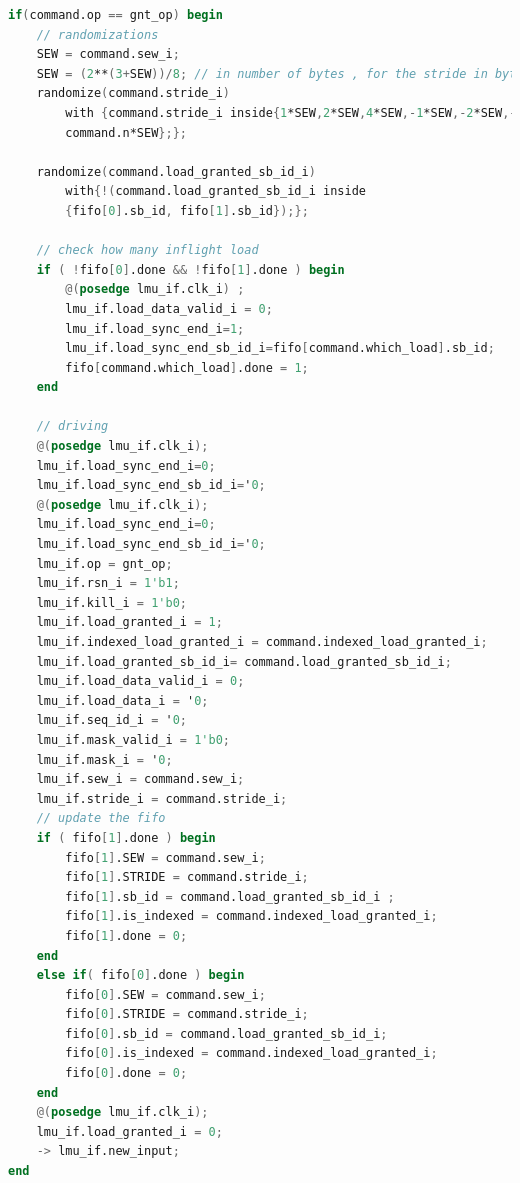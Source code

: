 \begin{lstlisting}[language=Verilog,style=verilog-style, backgroundcolor=\color{lyel_palette}, frame=tlb]
if(command.op == gnt_op) begin
    // randomizations
    SEW = command.sew_i;
    SEW = (2**(3+SEW))/8; // in number of bytes , for the stride in bytes
    randomize(command.stride_i) 
        with {command.stride_i inside{1*SEW,2*SEW,4*SEW,-1*SEW,-2*SEW,-4*SEW,
        command.n*SEW};};

    randomize(command.load_granted_sb_id_i) 
        with{!(command.load_granted_sb_id_i inside
        {fifo[0].sb_id, fifo[1].sb_id});};

    // check how many inflight load
    if ( !fifo[0].done && !fifo[1].done ) begin
	    @(posedge lmu_if.clk_i) ;
	    lmu_if.load_data_valid_i = 0;
	    lmu_if.load_sync_end_i=1;
	    lmu_if.load_sync_end_sb_id_i=fifo[command.which_load].sb_id;	
	    fifo[command.which_load].done = 1;
    end 

    // driving
    @(posedge lmu_if.clk_i);
    lmu_if.load_sync_end_i=0;
    lmu_if.load_sync_end_sb_id_i='0;
    @(posedge lmu_if.clk_i);
    lmu_if.load_sync_end_i=0;
    lmu_if.load_sync_end_sb_id_i='0;
    lmu_if.op = gnt_op;
    lmu_if.rsn_i = 1'b1;
    lmu_if.kill_i = 1'b0;
    lmu_if.load_granted_i = 1;
    lmu_if.indexed_load_granted_i = command.indexed_load_granted_i;
    lmu_if.load_granted_sb_id_i= command.load_granted_sb_id_i;
    lmu_if.load_data_valid_i = 0;
    lmu_if.load_data_i = '0;
    lmu_if.seq_id_i = '0;
    lmu_if.mask_valid_i = 1'b0;
    lmu_if.mask_i = '0;
    lmu_if.sew_i = command.sew_i;     
    lmu_if.stride_i = command.stride_i;
    // update the fifo
    if ( fifo[1].done ) begin
	    fifo[1].SEW = command.sew_i;
	    fifo[1].STRIDE = command.stride_i;
	    fifo[1].sb_id = command.load_granted_sb_id_i ;
	    fifo[1].is_indexed = command.indexed_load_granted_i;
	    fifo[1].done = 0;
    end
    else if( fifo[0].done ) begin
	    fifo[0].SEW = command.sew_i;
	    fifo[0].STRIDE = command.stride_i;
	    fifo[0].sb_id = command.load_granted_sb_id_i;
	    fifo[0].is_indexed = command.indexed_load_granted_i;
	    fifo[0].done = 0;
    end
    @(posedge lmu_if.clk_i);
    lmu_if.load_granted_i = 0;
    -> lmu_if.new_input;
end




\end{lstlisting}
\newpage


